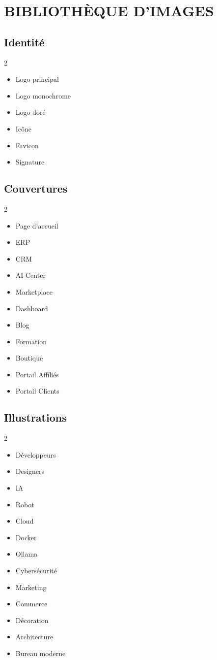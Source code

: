 \documentclass[12pt,a4paper,oneside]{book}
\begin{document}
\chapter{BIBLIOTHÈQUE D'IMAGES}

\section{Identité}
\begin{multicols}{2}
\begin{itemize}
\item Logo principal
\item Logo monochrome
\item Logo doré
\item Icône
\item Favicon
\item Signature
\end{itemize}
\end{multicols}

\section{Couvertures}
\begin{multicols}{2}
\begin{itemize}
\item Page d'accueil
\item ERP
\item CRM
\item AI Center
\item Marketplace
\item Dashboard
\item Blog
\item Formation
\item Boutique
\item Portail Affiliés
\item Portail Clients
\end{itemize}
\end{multicols}

\section{Illustrations}
\begin{multicols}{2}
\begin{itemize}
\item Développeurs
\item Designers
\item IA
\item Robot
\item Cloud
\item Docker
\item Ollama
\item Cybersécurité
\item Marketing
\item Commerce
\item Décoration
\item Architecture
\item Bureau moderne
\end{itemize}
\end{multicols}
\end{document}
